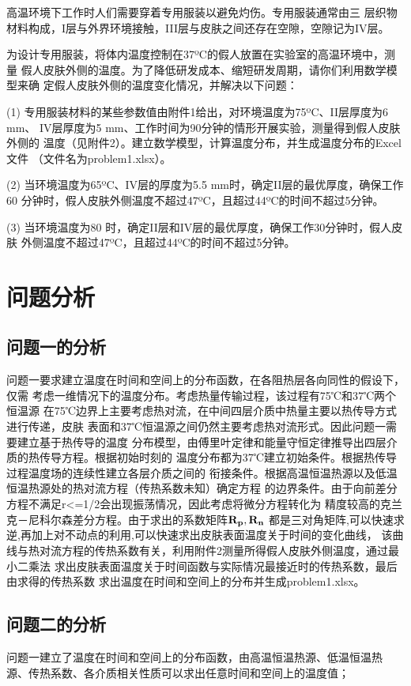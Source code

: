 \documentclass{cumcmthesis}
\begin{document}
        高温环境下工作时人们需要穿着专用服装以避免灼伤。专用服装通常由三
    层织物材料构成，I层与外界环境接触，III层与皮肤之间还存在空隙，空隙记为IV层。

        为设计专用服装，将体内温度控制在37ºC的假人放置在实验室的高温环境中，测量
    假人皮肤外侧的温度。为了降低研发成本、缩短研发周期，请你们利用数学模型来确
    定假人皮肤外侧的温度变化情况，并解决以下问题：

        (1) 专用服装材料的某些参数值由附件1给出，对环境温度为75ºC、II层厚度为6 mm、
        IV层厚度为5 mm、工作时间为90分钟的情形开展实验，测量得到假人皮肤外侧的
        温度（见附件2）。建立数学模型，计算温度分布，并生成温度分布的Excel文件
        （文件名为problem1.xlsx）。

        (2) 当环境温度为65ºC、IV层的厚度为5.5 mm时，确定II层的最优厚度，确保工作60
        分钟时，假人皮肤外侧温度不超过47ºC，且超过44ºC的时间不超过5分钟。
    
        (3) 当环境温度为80 时，确定II层和IV层的最优厚度，确保工作30分钟时，假人皮肤
        外侧温度不超过47ºC，且超过44ºC的时间不超过5分钟。
\section{问题分析}
    \subsection{问题一的分析}
    问题一要求建立温度在时间和空间上的分布函数，在各阻热层各向同性的假设下，仅需
    考虑一维情况下的温度分布。考虑热量传输过程，该过程有75℃和37℃两个恒温源
    在75℃边界上主要考虑热对流，在中间四层介质中热量主要以热传导方式进行传递，皮肤
    表面和37℃恒温源之间仍然主要考虑热对流形式。因此问题一需要建立基于热传导的温度
    分布模型，由傅里叶定律和能量守恒定律推导出四层介质的热传导方程。根据初始时刻的
    温度分布都为37℃建立初始条件。根据热传导过程温度场的连续性建立各层介质之间的
    衔接条件。根据高温恒温热源以及低温恒温热源处的热对流方程（传热系数未知）确定方程
    的边界条件。由于向前差分方程不满足r<=1/2会出现振荡情况，因此考虑将微分方程转化为
    精度较高的克兰克－尼科尔森差分方程\cite{1}。由于求出的系数矩阵\(\bf{R_p},\bf{R_n}\)
    都是三对角矩阵,可以快速求逆,再加上对不动点的利用,可以快速求出皮肤表面温度关于时间的变化曲线，
    该曲线与热对流方程的传热系数有关，利用附件2测量所得假人皮肤外侧温度，通过最小二乘法
    求出皮肤表面温度关于时间函数与实际情况最接近时的传热系数，最后由求得的传热系数
    求出温度在时间和空间上的分布并生成problem1.xlsx。

    \subsection{问题二的分析}
    问题一建立了温度在时间和空间上的分布函数，由高温恒温热源、低温恒温热
    源、传热系数、各介质相关性质可以求出任意时间和空间上的温度值；
\end{document}
